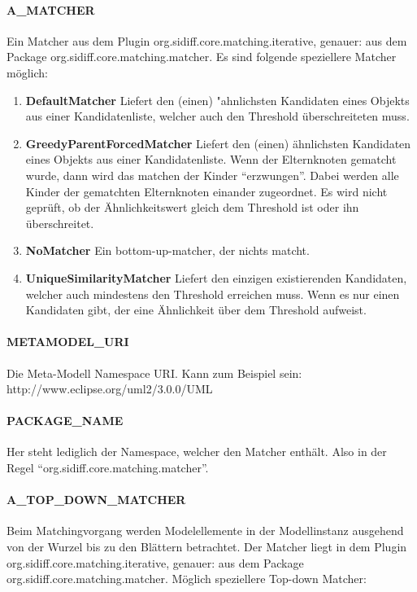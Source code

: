 \documentclass{article}
\begin{document}
\paragraph{A\_MATCHER}

Ein Matcher aus dem Plugin org.sidiff.core.matching.iterative,
genauer: aus dem Package org.sidiff.core.matching.matcher. Es sind folgende speziellere
Matcher möglich:
\begin{enumerate}
  \item \textbf{DefaultMatcher}
  Liefert den (einen) "ahnlichsten Kandidaten eines
  Objekts aus einer Kandidatenliste, welcher auch den Threshold überschreiteten
  muss.
  \item \textbf{GreedyParentForcedMatcher}
  Liefert den (einen) ähnlichsten
  Kandidaten eines Objekts aus einer Kandidatenliste. Wenn der Elternknoten gematcht wurde,
  dann wird das matchen der Kinder ``erzwungen''. Dabei werden alle Kinder der
  gematchten Elternknoten einander zugeordnet. Es wird nicht geprüft, ob der
  Ähnlichkeitswert gleich dem Threshold ist oder ihn überschreitet.
  \item \textbf{NoMatcher}
  Ein bottom-up-matcher, der nichts matcht.
  \item \textbf{UniqueSimilarityMatcher}
  Liefert den einzigen existierenden Kandidaten,
  welcher auch mindestens den Threshold erreichen muss. Wenn es nur einen Kandidaten
  gibt, der eine Ähnlichkeit über dem Threshold aufweist.
\end{enumerate}


\paragraph{METAMODEL\_URI}
Die Meta-Modell Namespace URI.
Kann zum Beispiel sein: http://www.eclipse.org/uml2/3.0.0/UML

\paragraph{PACKAGE\_NAME} 
Her steht lediglich der Namespace, welcher den Matcher enthält.
Also in der Regel ``org.sidiff.core.matching.matcher''.

\paragraph{A\_TOP\_DOWN\_MATCHER}
Beim Matchingvorgang werden Modelellemente in der Modellinstanz ausgehend von
der Wurzel bis zu den Blättern betrachtet. Der Matcher liegt in dem
Plugin org.sidiff.core.matching.iterative,
genauer: aus dem Package org.sidiff.core.matching.matcher. Möglich speziellere
Top-down Matcher:
\end{document}
